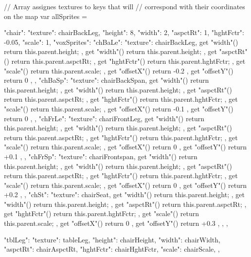 // Array assignes textures to keys that will
// correspond with their coordinates on the map
var allSprites = {

  "chair": {
    "texture": chairBackLeg,
    "height": 8,
    "width": 2,
    "aspctRt": 1,
    "hghtFctr": -0.05,
    "scale": 1,
    "voxSprites": {
      "chBaLe": {
        "texture": chairBackLeg,
        get "width"() { return this.parent.height; },
        get "width"() { return this.parent.height; },
        get "aspctRt"() { return this.parent.aspctRt; },
        get "hghtFctr"() { return this.parent.hghtFctr; },
        get "scale"() { return this.parent.scale; },
        get "offsetX"() { return -0.2 },
        get "offsetY"() { return 0 },
      },  
      "chBaSp": {
        "texture": chairBackSpan,
        get "width"() { return this.parent.height; },
        get "width"() { return this.parent.height; },
        get "aspctRt"() { return this.parent.aspctRt; },
        get "hghtFctr"() { return this.parent.hghtFctr; },
        get "scale"() { return this.parent.scale; },
        get "offsetX"() { return -0.1 },
        get "offsetY"() { return 0 },
      },
      "chFrLe": {
        "texture": chariFrontLeg,
        get "width"() { return this.parent.height; },
        get "width"() { return this.parent.height; },
        get "aspctRt"() { return this.parent.aspctRt; },
        get "hghtFctr"() { return this.parent.hghtFctr; },
        get "scale"() { return this.parent.scale; },
        get "offsetX"() { return 0 },
        get "offsetY"() { return +0.1 },
      },
      "chFrSp": {
        "texture": chariFrontspan,
        get "width"() { return this.parent.height; },
        get "width"() { return this.parent.height; },
        get "aspctRt"() { return this.parent.aspctRt; },
        get "hghtFctr"() { return this.parent.hghtFctr; },
        get "scale"() { return this.parent.scale; },
        get "offsetX"() { return 0 },
        get "offsetY"() { return +0.2 },
      },
      "chSt": {
        "texture": chairSeat,
        get "width"() { return this.parent.height; },
        get "width"() { return this.parent.height; },
        get "aspctRt"() { return this.parent.aspctRt; },
        get "hghtFctr"() { return this.parent.hghtFctr; },
        get "scale"() { return this.parent.scale; },
        get "offsetX"() { return 0 },
        get "offsetY"() { return +0.3 },
      },
    }
  },

  "tblLeg": {
    "texture": tableLeg,
    "height": chairHeight,
    "width": chairWidth,
    "aspctRt": chairAspctRt,
    "hghtFctr": chairHghtFctr,
    "scale": chairScale,
  },  

}
